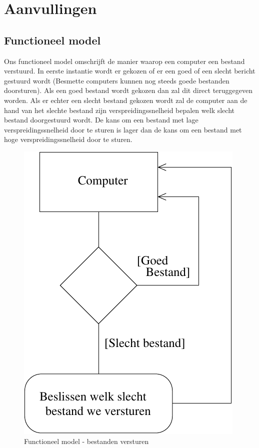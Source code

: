 \documentclass[a4paper,oneside]{report}
\begin{document}
\newpage
\section{Aanvullingen}
\subsection{Functioneel model}
Ons functioneel model omschrijft de manier waarop een computer een bestand verstuurd. In eerste instantie wordt er gekozen of 
er een goed of een slecht bericht gestuurd wordt (Besmette computers kunnen nog steeds goede bestanden doorsturen). Als een goed
bestand wordt gekozen dan zal dit direct teruggegeven worden. Als er echter een slecht bestand gekozen wordt zal de computer aan de 
hand van het slechte bestand zijn verspreidingssnelheid bepalen welk slecht bestand doorgestuurd wordt. De kans om een bestand met 
lage verspreidingssnelheid door te sturen is lager dan de kans om een bestand met hoge verspreidingssnelheid door te sturen.
\eindlemma

\begin{figure}[h!]
\begin{center}
\includegraphics[scale=0.80]{funcmodel}
\caption{Functioneel model - bestanden versturen}
\end{center}
\end{figure}
\end{document}
